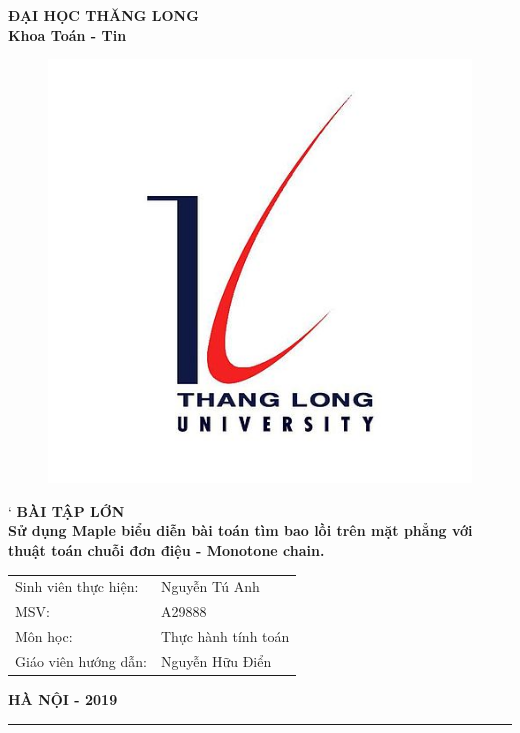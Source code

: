 %
\begin{titlepage}
    \begin{center}
        {\bfseries ĐẠI HỌC THĂNG LONG\\Khoa Toán - Tin}
    \end{center}
    \begin{figure}[!ht]
        \centering
        \includegraphics[scale = 0.4]{Image/LogoTLU}
    \end{figure}
    \begin{center}
`       {\Large \bfseries BÀI TẬP LỚN\\}
        \vspace*{1cm}
        {\huge \bfseries  Sử dụng Maple biểu diễn bài toán tìm bao lồi trên mặt phẳng với thuật toán chuỗi đơn điệu - Monotone chain.}
    \end{center}
    \vspace*{1cm}
    \begin{flushright}
        \parbox[l]{8cm}{
            \bfseries
            \begin{tabular}{ l  l }
                Sinh viên thực hiện:& Nguyễn Tú Anh \\
                MSV:& A29888  \\
                Môn học:& Thực hành tính toán\\
                Giáo viên hướng dẫn:& Nguyễn Hữu Điển \\
            \end{tabular}
        }
    \end{flushright}
    \vfill
    \centerline{\bf HÀ NỘI - 2019}
\end{titlepage}
\vfill
\hrule
\thispagestyle{empty}